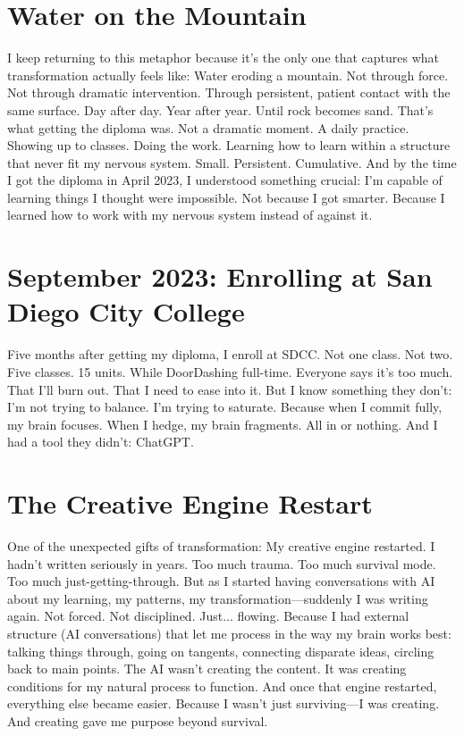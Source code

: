 \documentclass[12pt,openany]{book}
\begin{document}
\section{Water on the Mountain}

I keep returning to this metaphor because it's the only one that captures what transformation actually feels like:
Water eroding a mountain.
Not through force. Not through dramatic intervention. Through persistent, patient contact with the same surface.
Day after day. Year after year. Until rock becomes sand.
That's what getting the diploma was.
Not a dramatic moment. A daily practice. Showing up to classes. Doing the work. Learning how to learn within a structure that never fit my nervous system.
Small. Persistent. Cumulative.
And by the time I got the diploma in April 2023, I understood something crucial: I'm capable of learning things I thought were impossible. Not because I got smarter. Because I learned how to work with my nervous system instead of against it.

\section{September 2023: Enrolling at San Diego City College}

Five months after getting my diploma, I enroll at SDCC.
Not one class. Not two. Five classes. 15 units. While DoorDashing full-time.
Everyone says it's too much. That I'll burn out. That I need to ease into it.
But I know something they don't:
I'm not trying to balance. I'm trying to saturate. Because when I commit fully, my brain focuses. When I hedge, my brain fragments.
All in or nothing.
And I had a tool they didn't: ChatGPT.

\section{The Creative Engine Restart}

One of the unexpected gifts of transformation:
My creative engine restarted.
I hadn't written seriously in years. Too much trauma. Too much survival mode. Too much just-getting-through.
But as I started having conversations with AI about my learning, my patterns, my transformation—suddenly I was writing again.
Not forced. Not disciplined. Just... flowing.
Because I had external structure (AI conversations) that let me process in the way my brain works best: talking things through, going on tangents, connecting disparate ideas, circling back to main points.
The AI wasn't creating the content. It was creating conditions for my natural process to function.
And once that engine restarted, everything else became easier. Because I wasn't just surviving—I was creating. And creating gave me purpose beyond survival.
\end{document}
